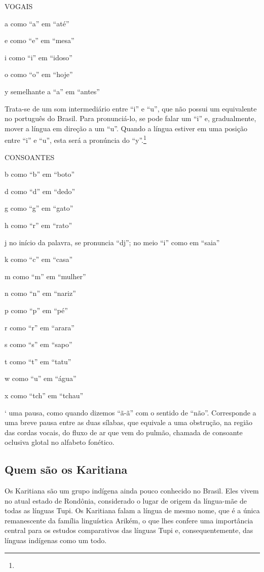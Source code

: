 VOGAIS

a como ``a'' em ``até''

e como ``e'' em ``mesa''

i como ``i'' em ``idoso''

o como ``o'' em ``hoje''

y semelhante a ``a'' em ``antes''

Trata-se de um som intermediário entre ``i'' e ``u'', que não possui um
equivalente no português do Brasil. Para pronunciá-lo, se pode falar um
``i'' e, gradualmente, mover a língua em direção a um ``u''. Quando a
língua estiver em uma posição entre ``i'' e ``u'', esta será a pronúncia
do ``y''.\footnote{}

CONSOANTES

b como ``b'' em ``boto''

d como ``d'' em ``dedo''

g como ``g'' em ``gato''

h como ``r'' em ``rato''

j no início da palavra, se pronuncia ``dj''; no meio ``i'' como em
``saia''

k como ``c'' em ``casa''

m como ``m'' em ``mulher''

n como ``n'' em ``nariz''

p como ``p'' em ``pé''

r como ``r'' em ``arara''

s como ``s'' em ``sapo''

t como ``t'' em ``tatu''

w como ``u'' em ``água''

x como ``tch'' em ``tchau''

` uma pausa, como quando dizemos ``ã-ã'' com o sentido de ``não''.
Corresponde a uma breve pausa entre as duas sílabas, que equivale a uma
obstrução, na região das cordas vocais, do fluxo de ar que vem do
pulmão, chamada de consoante oclusiva glotal no alfabeto fonético.

\subsection{Quem são os Karitiana}\label{quem-suxe3o-os-karitiana}

Os Karitiana são um grupo indígena ainda pouco conhecido no Brasil. Eles
vivem no atual estado de Rondônia, considerado o lugar de origem da
língua-mãe de todas as línguas Tupi. Os Karitiana falam a língua de
mesmo nome, que é a única remanescente da família linguística Arikém, o
que lhes confere uma importância central para os estudos comparativos
das línguas Tupi e, consequentemente, das línguas indígenas como um
todo.

